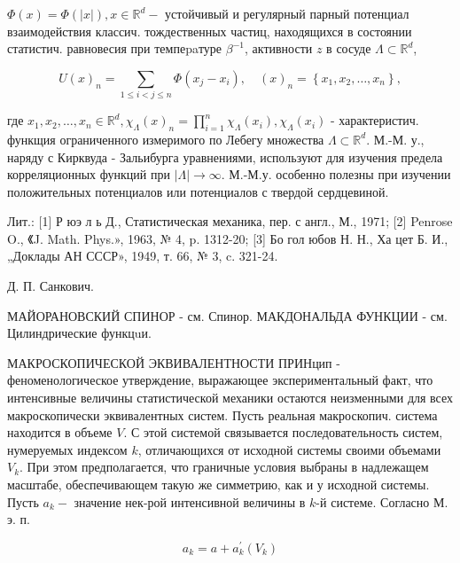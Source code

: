 \documentclass[10pt]{article}
\begin{document}
$\Phi(x)=\Phi(|x|), x \in \mathbb{R}^{d}-$ устойчивый и регулярный парный потенциал взаимодействия классич. тождественных частиц, находящихся в состоянии статистич. равновесия при темпеpaтуре $\beta^{-1}$, активности $z$ в сосуде $\Lambda \subset \mathbb{R}^{d}$,



\[

U(x)_{n}=\sum_{1 \leqslant i<j \leqslant n} \Phi\left(x_{j}-x_{i}\right), \quad(x)_{n}=\left\{x_{1}, x_{2}, \ldots, x_{n}\right\},

\]



где $x_{1}, x_{2}, \ldots, x_{n} \in \mathbb{R}^{d}, \chi_{\Lambda}(x)_{n}=\prod_{i=1}^{n} \chi_{\Lambda}\left(x_{i}\right), \chi_{\Lambda}\left(x_{i}\right)$ - характеристич. функщия ограниченного измеримого по Лебегу множества $\Lambda \subset \mathbb{R}^{d}$. М.-М. у., наряду с Кирквуда - Зальибурга уравнениями, используют для изучения предела корреляционных функций при $|\Lambda| \rightarrow \infty$. М.-М.у. особенно полезны при изучении положительных потенциалов или потенциалов с твердой сердцевиной.



Лит.: [1] Р юэ л ь Д., Статистическая механика, пер. с англ., М., 1971; [2] Penrose O., 《J. Math. Phys.», 1963, № 4, p. 1312-20; [3] Бо гол юбов Н. Н., Ха цет Б. И., „Доклады АН СССР», 1949, т. 66, № 3, c. 321-24.



Д. П. Санкович.



МАЙОРАНОВСКИЙ СПИНОР - см. Спинор. МАКДОНАЛЬДА ФУНКЦИИ - см. Цилиндрические функцuи.



МАКРОСКОПИЧЕСКОЙ ЭКВИВАЛЕНТНОСТИ ПРИНцип - феноменологическое утверждение, выражающее экспериментальный факт, что интенсивные величины статистической механики остаются неизменными для всех макроскопически эквивалентных систем. Пусть реальная макроскопич. система находится в объеме $V$. С этой системой связывается последовательность систем, нумеруемых индексом $k$, отличающихся от исходной системы своими объемами $V_{k}$. При этом предполагается, что граничные условия выбраны в надлежащем масштабе, обеспечивающем такую же симметрию, как и у исходной системы. Пусть $a_{k}-$ значение нек-рой интенсивной величины в $k$-й системе. Согласно М. э. п.



\[

a_{k}=a+a_{k}^{\prime}\left(V_{k}\right)

\]
\end{document}
